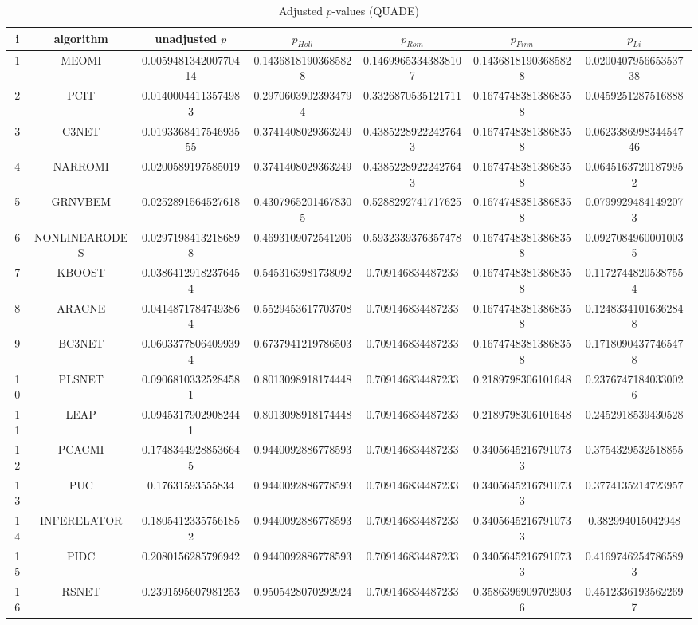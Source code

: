 \documentclass[a4paper,10pt]{article}
\begin{document}
\begin{landscape}
\begin{table}[!htp]
\centering\scriptsize
\caption{Adjusted $p$-values (QUADE)}
\begin{tabular}{ccccccc}
i&algorithm&unadjusted $p$&$p_{Holl}$&$p_{Rom}$&$p_{Finn}$&$p_{Li}$\\
\hline
1&MEOMI&0.005948134200770414&0.14368181903685828&0.14699653343838107&0.14368181903685828&0.020040795665353738\\
2&PCIT&0.01400044113574983&0.29706039023934794&0.3326870535121711&0.16747483813868358&0.0459251287516888\\
3&C3NET&0.019336841754693555&0.3741408029363249&0.43852289222427643&0.16747483813868358&0.062338699834454746\\
4&NARROMI&0.0200589197585019&0.3741408029363249&0.43852289222427643&0.16747483813868358&0.06451637201879952\\
5&GRNVBEM&0.0252891564527618&0.43079652014678305&0.5288292741717625&0.16747483813868358&0.07999294841492073\\
6&NONLINEARODES&0.02971984132186898&0.4693109072541206&0.5932339376357478&0.16747483813868358&0.09270849600010035\\
7&KBOOST&0.03864129182376454&0.5453163981738092&0.709146834487233&0.16747483813868358&0.11727448205387554\\
8&ARACNE&0.04148717847493864&0.5529453617703708&0.709146834487233&0.16747483813868358&0.12483341016362848\\
9&BC3NET&0.06033778064099394&0.6737941219786503&0.709146834487233&0.16747483813868358&0.17180904377465478\\
10&PLSNET&0.09068103325284581&0.8013098918174448&0.709146834487233&0.2189798306101648&0.23767471840330026\\
11&LEAP&0.09453179029082441&0.8013098918174448&0.709146834487233&0.2189798306101648&0.2452918539430528\\
12&PCACMI&0.17483449288536645&0.9440092886778593&0.709146834487233&0.34056452167910733&0.3754329532518855\\
13&PUC&0.17631593555834&0.9440092886778593&0.709146834487233&0.34056452167910733&0.3774135214723957\\
14&INFERELATOR&0.18054123357561852&0.9440092886778593&0.709146834487233&0.34056452167910733&0.382994015042948\\
15&PIDC&0.2080156285796942&0.9440092886778593&0.709146834487233&0.34056452167910733&0.41697462547865893\\
16&RSNET&0.2391595607981253&0.9505428070292924&0.709146834487233&0.35863969097029036&0.45123361935622697\\

\end{tabular}
\end{table}
\end{landscape}
\end{document}
